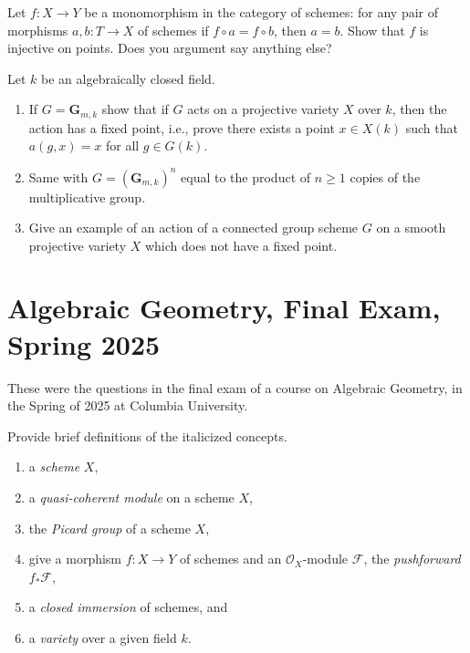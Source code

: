 \begin{exercise}[Monomorphisms]
\label{exercise-monomorphisms}
Let $f : X \to Y$ be a monomorphism in the category of schemes:
for any pair of morphisms $a, b : T \to X$ of schemes if
$f \circ a = f \circ b$, then $a = b$. Show that $f$ is injective
on points. Does you argument say anything else?
\end{exercise}

\begin{exercise}
\label{exercise-fix-points}
Let $k$ be an algebraically closed field.
\begin{enumerate}
\item If $G = \mathbf{G}_{m, k}$ show that if $G$ acts on a
projective variety $X$ over $k$, then the action has a fixed point, i.e.,
prove there exists a point $x \in X(k)$ such that $a(g, x) = x$ for
all $g \in G(k)$.
\item Same with $G = (\mathbf{G}_{m, k})^n$ equal to the product of
$n \geq 1$ copies of the multiplicative group.
\item Give an example of an action of a connected group scheme $G$
on a smooth projective variety $X$ which does not have a fixed point.
\end{enumerate}
\end{exercise}



\section{Algebraic Geometry, Final Exam, Spring 2025}
\label{section-final-exam-spring-2025}

\noindent
These were the questions in the final exam of a course on Algebraic Geometry,
in the Spring of 2025 at Columbia University.

\begin{exercise}[Definitions]
\label{exercise-definitions-spring-2025}
Provide brief definitions of the italicized concepts.
\begin{enumerate}
\item a {\it scheme} $X$,
\item a {\it quasi-coherent module} on a scheme $X$,
\item the {\it Picard group} of a scheme $X$,
\item give a morphism $f : X \to Y$ of schemes and an
$\mathcal{O}_X$-module $\mathcal{F}$, the {\it pushforward} $f_*\mathcal{F}$,
\item a {\it closed immersion} of schemes, and
\item a {\it variety} over a given field $k$.
\end{enumerate}
\end{exercise}

